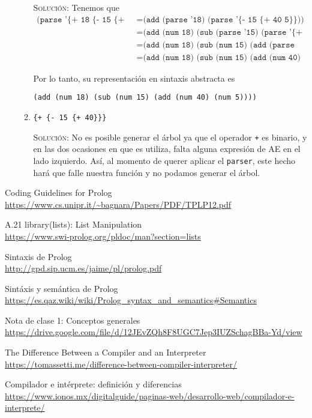 \documentclass[letterpaper,11pt]{article}
\begin{document}
\begin{enumerate}
\begin{enumerate}
        \textsc{Solución:} Tenemos que 
        \begin{align*}
            \texttt{(parse '\{+ 18 \{- 15 \{+ 40 5\}\}\})}
            &= \texttt{(add (parse '18) (parse '\{- 15 \{+ 40 5\}\}))} \\
            &= \texttt{(add (num 18) (sub (parse '15) (parse '\{+ 40 5\})))} \\
            &= \texttt{(add (num 18) (sub (num 15) (add (parse '40) (parse '5))))} \\
            &= \texttt{(add (num 18) (sub (num 15) (add (num 40) (num 5))))}
        \end{align*}

        Por lo tanto, su representación en sintaxis abstracta es 
        \begin{center}
            \texttt{(add (num 18) (sub (num 15) (add (num 40) (num 5))))}
        \end{center}

        \item \texttt{\{+ \{- 15 \{+ 40\}\}\}}

        \textsc{Solución:} No es posible generar el árbol ya que el operador 
        \texttt{+} es binario, y en las dos ocasiones en que es utiliza, falta 
        alguna expresión de AE en el lado izquierdo. Así, al momento de
        querer aplicar el \texttt{parser}, este hecho hará que falle nuestra 
        función y no podamos generar el árbol. 
    \end{enumerate}
\end{enumerate}

\begin{thebibliography}{10}
    Coding Guidelines for Prolog \\ 
    \url{https://www.cs.unipr.it/~bagnara/Papers/PDF/TPLP12.pdf}

    A.21 library(lists): List Manipulation \\
    \url{https://www.swi-prolog.org/pldoc/man?section=lists}

    Sintaxis de Prolog \\
    \url{http://gpd.sip.ucm.es/jaime/pl/prolog.pdf}

    Sintáxis y semántica de Prolog \\
    \url{https://es.qaz.wiki/wiki/Prolog_syntax_and_semantics#Semantics}
    
    Nota de clase 1: Conceptos generales\\
    \url{https://drive.google.com/file/d/12JEvZQh8F8UGC7Jep3IUZSchagBBa-Yd/view}

    The Difference Between a Compiler and an Interpreter \\
    \url{https://tomassetti.me/difference-between-compiler-interpreter/}

    Compilador e intérprete: definición y diferencias \\
    \url{https://www.ionos.mx/digitalguide/paginas-web/desarrollo-web/compilador-e-interprete/}
\end{thebibliography}
\end{document}

